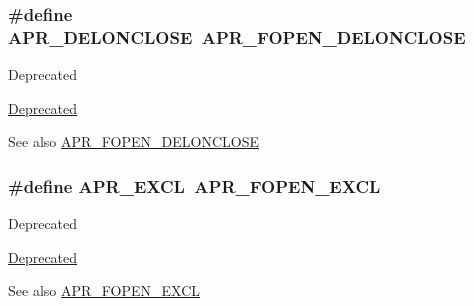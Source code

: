 \subsubsection[{\texorpdfstring{A\+P\+R\+\_\+\+D\+E\+L\+O\+N\+C\+L\+O\+SE}{APR_DELONCLOSE}}]{\setlength{\rightskip}{0pt plus 5cm}\#define A\+P\+R\+\_\+\+D\+E\+L\+O\+N\+C\+L\+O\+SE~{\bf A\+P\+R\+\_\+\+F\+O\+P\+E\+N\+\_\+\+D\+E\+L\+O\+N\+C\+L\+O\+SE}}\hypertarget{group__apr__file__open__flags_gaebc7f034a72dffe64858b1b9451994ff}{}\label{group__apr__file__open__flags_gaebc7f034a72dffe64858b1b9451994ff}
\begin{DoxyRefDesc}{Deprecated}
\item[\hyperlink{deprecated__deprecated000025}{Deprecated}]\end{DoxyRefDesc}
\begin{DoxySeeAlso}{See also}
\hyperlink{group__apr__file__open__flags_ga5d3756f6d242c667ed1d3f54af4916eb}{A\+P\+R\+\_\+\+F\+O\+P\+E\+N\+\_\+\+D\+E\+L\+O\+N\+C\+L\+O\+SE} 
\end{DoxySeeAlso}
\subsubsection[{\texorpdfstring{A\+P\+R\+\_\+\+E\+X\+CL}{APR_EXCL}}]{\setlength{\rightskip}{0pt plus 5cm}\#define A\+P\+R\+\_\+\+E\+X\+CL~{\bf A\+P\+R\+\_\+\+F\+O\+P\+E\+N\+\_\+\+E\+X\+CL}}\hypertarget{group__apr__file__open__flags_ga209c26b2b903cc23417f6781d4edf891}{}\label{group__apr__file__open__flags_ga209c26b2b903cc23417f6781d4edf891}
\begin{DoxyRefDesc}{Deprecated}
\item[\hyperlink{deprecated__deprecated000023}{Deprecated}]\end{DoxyRefDesc}
\begin{DoxySeeAlso}{See also}
\hyperlink{group__apr__file__open__flags_gabb7fb062cdf1d58faee8c7ea518496f1}{A\+P\+R\+\_\+\+F\+O\+P\+E\+N\+\_\+\+E\+X\+CL} 
\end{DoxySeeAlso}
